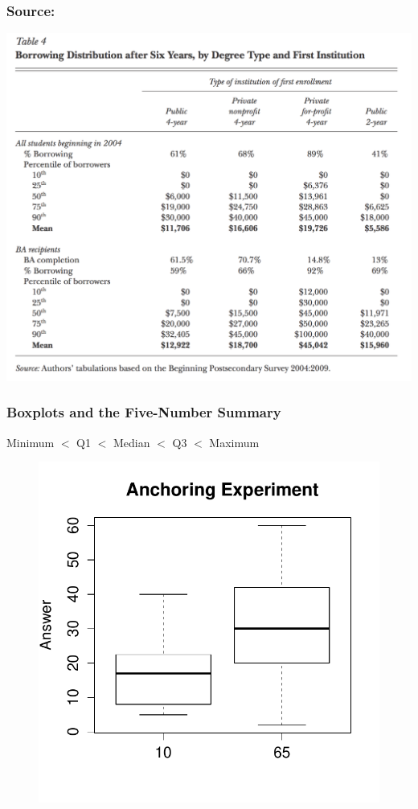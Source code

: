 \documentclass[handout]{beamer}
\begin{document}
\begin{frame}
\frametitle{\footnotesize Source: \href{http://www.aeaweb.org/articles.php?doi=10.1257/jep.26.1.165}{}}


\centering \includegraphics[scale = 0.18]{./images/student_borrowing}


\end{frame}



\begin{frame}
\frametitle{Boxplots and the Five-Number Summary}
Minimum $<$ Q1 $<$ Median $<$ Q3 $<$ Maximum

\begin{figure}
\centering \includegraphics[scale = 0.65]{./images/anchoring_boxplot}
\end{figure}

\end{frame}
\end{document}

